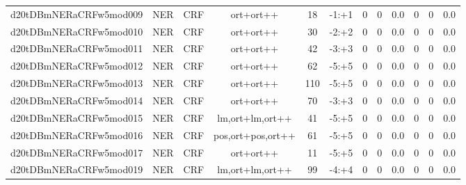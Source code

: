\documentclass[a4paper]{article}
\begin{document}
\begin{landscape}
\begin{center}
\begin{tabular}{ |c|c|c|c|c|c|c|c|c|c|c|c|}
 
 	
 	\small{ d20tDBmNERaCRFw5mod009 } & \small{ NER} & \small{  CRF }  & ort+ort++  &  18 &  \small{  -1:+1 }  &  0 & 0 & 0.0  &  0 & 0 & 0.0 \\
 	

 
 	
 	\small{ d20tDBmNERaCRFw5mod010 } & \small{ NER} & \small{  CRF }  & ort+ort++  &  30 &  \small{  -2:+2 }  &  0 & 0 & 0.0  &  0 & 0 & 0.0 \\
 	

 
 	
 	\small{ d20tDBmNERaCRFw5mod011 } & \small{ NER} & \small{  CRF }  & ort+ort++  &  42 &  \small{  -3:+3 }  &  0 & 0 & 0.0  &  0 & 0 & 0.0 \\
 	

 
 	
 	\small{ d20tDBmNERaCRFw5mod012 } & \small{ NER} & \small{  CRF }  & ort+ort++  &  62 &  \small{  -5:+5 }  &  0 & 0 & 0.0  &  0 & 0 & 0.0 \\
 	

 
 	
 	\small{ d20tDBmNERaCRFw5mod013 } & \small{ NER} & \small{  CRF }  & ort+ort++  &  110 &  \small{  -5:+5 }  &  0 & 0 & 0.0  &  0 & 0 & 0.0 \\
 	

 
 	
 	\small{ d20tDBmNERaCRFw5mod014 } & \small{ NER} & \small{  CRF }  & ort+ort++  &  70 &  \small{  -3:+3 }  &  0 & 0 & 0.0  &  0 & 0 & 0.0 \\
 	

 
 	
 	\small{ d20tDBmNERaCRFw5mod015 } & \small{ NER} & \small{  CRF }  & lm,ort+lm,ort++  &  41 &  \small{  -5:+5 }  &  0 & 0 & 0.0  &  0 & 0 & 0.0 \\
 	

 
 	
 	\small{ d20tDBmNERaCRFw5mod016 } & \small{ NER} & \small{  CRF }  & pos,ort+pos,ort++  &  61 &  \small{  -5:+5 }  &  0 & 0 & 0.0  &  0 & 0 & 0.0 \\
 	

 
 	
 	\small{ d20tDBmNERaCRFw5mod017 } & \small{ NER} & \small{  CRF }  & ort+ort++  &  11 &  \small{  -5:+5 }  &  0 & 0 & 0.0  &  0 & 0 & 0.0 \\
 	

 
 	
 	\small{ d20tDBmNERaCRFw5mod019 } & \small{ NER} & \small{  CRF }  & lm,ort+lm,ort++  &  99 &  \small{  -4:+4 }  &  0 & 0 & 0.0  &  0 & 0 & 0.0 \\
 	


\end{tabular}
\end{center}
\end{landscape}
\end{document}
